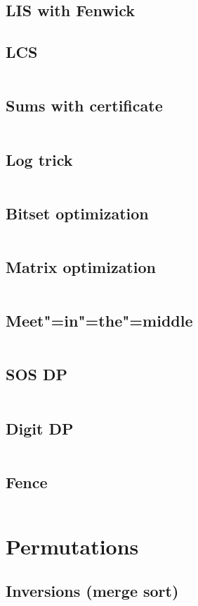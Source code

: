 ﻿\documentclass[a4paper,10pt,twocolumn,oneside]{article}
\begin{document}
\subsection{LIS with Fenwick}

\subsection{LCS}
\inputminted[breaklines]{python}{DP/lcs.py}
\subsection{Sums with certificate}
\inputminted[breaklines]{python}{DP/sums with certificate.py}
\subsection{Log trick}
\inputminted[breaklines]{cpp}{DP/log-trick.cpp}
\subsection{Bitset optimization}
\inputminted[breaklines]{cpp}{DP/bitset optimization.cpp}
\subsection{Matrix optimization}
\inputminted[breaklines]{cpp}{DP/matrix optimization.cpp}
\subsection{Meet"=in"=the"=middle}
\inputminted[breaklines]{cpp}{DP/meet-in-the-middle.cpp}
\subsection{SOS DP}
\inputminted[breaklines]{cpp}{DP/sos-dp.cpp}
\subsection{Digit DP}
\inputminted[breaklines]{cpp}{DP/digit dp.cpp}
\subsection{Fence}
\inputminted[breaklines]{cpp}{DP/fence.cpp}

\section{Permutations}
\subsection{Inversions (merge sort)}
\inputminted[breaklines]{cpp}{Permutations/inversions.cpp}
\end{document}
